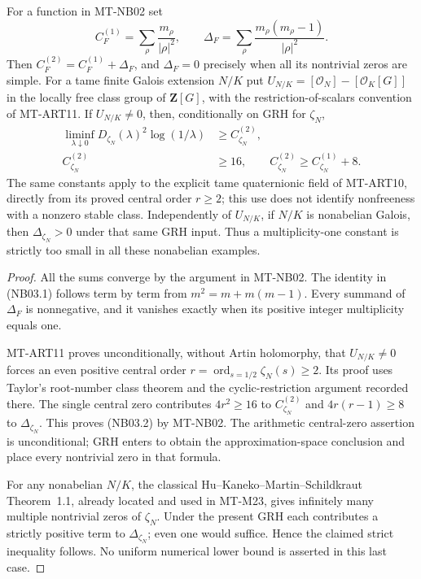 For a function in MT-NB02 set
\[
 C_F^{(1)}=\sum_\rho\frac{m_\rho}{|\rho|^2},\qquad
 \Delta_F=\sum_\rho\frac{m_\rho(m_\rho-1)}{|\rho|^2}.
 \tag{NB03.1}
\]
Then $C_F^{(2)}=C_F^{(1)}+\Delta_F$, and
$\Delta_F=0$ precisely when all its nontrivial zeros are simple.
For a tame finite Galois extension $N/K$ put
$U_{N/K}=[\mathcal O_N]-[\mathcal O_K[G]]$
in the locally free class group of $\mathbf Z[G]$, with the
restriction-of-scalars convention of MT-ART11. If
$U_{N/K}\ne0$, then, conditionally on GRH for $\zeta_N$,
\[
 \begin{split}
 \liminf_{\lambda\downarrow0}D_{\zeta_N}(\lambda)^2
                      \log(1/\lambda)&\ge C_{\zeta_N}^{(2)},\\
 C_{\zeta_N}^{(2)}&\ge16,\qquad
 C_{\zeta_N}^{(2)}\ge C_{\zeta_N}^{(1)}+8.
 \end{split}                                                   \tag{NB03.2}
\]
The same constants apply to the explicit tame quaternionic
field of MT-ART10, directly from its proved central order
$r\ge2$; this use does not identify nonfreeness with a nonzero
stable class. Independently of $U_{N/K}$, if $N/K$ is nonabelian
Galois, then $\Delta_{\zeta_N}>0$ under that same GRH input.
Thus a multiplicity-one constant is strictly too small in
all these nonabelian examples.

\begin{proof}
All the sums converge by the argument in MT-NB02. The identity
in (NB03.1) follows term by term from $m^2=m+m(m-1)$.
Every summand of $\Delta_F$ is nonnegative, and it vanishes
exactly when its positive integer multiplicity equals one.

MT-ART11 proves unconditionally, without Artin holomorphy,
that $U_{N/K}\ne0$ forces an even positive central order
$r=\operatorname{ord}_{s=1/2}\zeta_N(s)\ge2$. Its proof uses
Taylor's root-number class theorem and the cyclic-restriction
argument recorded there. The single central zero contributes
$4r^2\ge16$ to $C_{\zeta_N}^{(2)}$ and
$4r(r-1)\ge8$ to $\Delta_{\zeta_N}$. This proves (NB03.2)
by MT-NB02. The arithmetic central-zero assertion is
unconditional; GRH enters to obtain the approximation-space
conclusion and place every nontrivial zero in that formula.

For any nonabelian $N/K$, the classical
Hu--Kaneko--Martin--Schildkraut Theorem~1.1, already located
and used in MT-M23, gives infinitely many multiple nontrivial
zeros of $\zeta_N$. Under the present GRH each contributes a
strictly positive term to $\Delta_{\zeta_N}$; even one would
suffice. Hence the claimed strict inequality follows. No
uniform numerical lower bound is asserted in this last case.
\end{proof}

